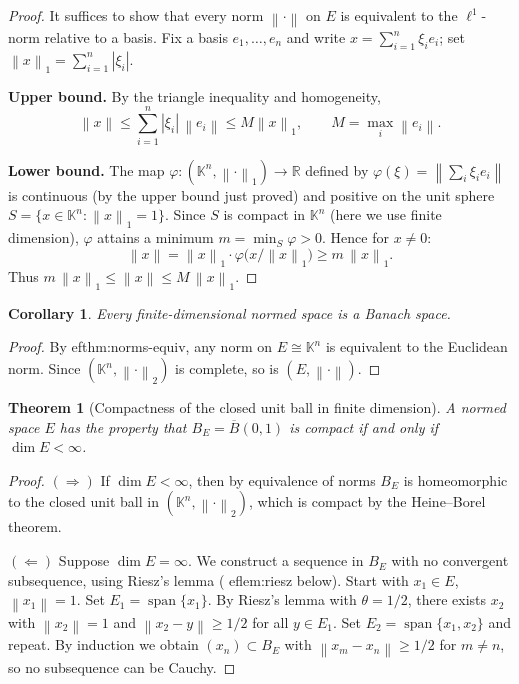 \documentclass[a4paper,12pt]{book}
\DeclareMathOperator{\spn}{span}
\newcommand{\R}{\mathbb{R}}
\newcommand{\K}{\mathbb{K}}
\newcommand{\norm}[1]{\left\| #1 \right\|}
\newcommand{\abs}[1]{\left| #1 \right|}
\theoremstyle{definition}
\theoremstyle{plain}
\newtheorem{theorem}[definition]{Theorem}
\newtheorem{corollary}[definition]{Corollary}
\theoremstyle{remark}
\begin{document}
\begin{proof}
It suffices to show that every norm $\norm{\cdot}$ on $E$ is equivalent
to the $\ell^1$-norm relative to a basis.  Fix a basis $e_1,\dots,e_n$
and write $x=\sum_{i=1}^n \xi_i e_i$; set
$\norm{x}_1=\sum_{i=1}^n\abs{\xi_i}$.

\textbf{Upper bound.}  By the triangle inequality and homogeneity,
\[
  \norm{x} \le \sum_{i=1}^n\abs{\xi_i}\,\norm{e_i}
  \le M\norm{x}_1,
  \qquad M = \max_i \norm{e_i}.
\]

\textbf{Lower bound.}  The map $\varphi:(\K^n,\norm{\cdot}_1)\to\R$
defined by $\varphi(\xi)=\norm{\sum_i\xi_i e_i}$ is continuous (by the
upper bound just proved) and positive on the unit sphere
$S=\{x\in\K^n:\norm{x}_1=1\}$.  Since $S$ is compact in $\K^n$
(here we use finite dimension), $\varphi$ attains a minimum
$m=\min_{S}\varphi > 0$.  Hence for $x\ne 0$:
\[
  \norm{x}
  = \norm{x}_1\cdot\varphi\!\bigl(x/\norm{x}_1\bigr)
  \ge m\,\norm{x}_1.
\]
Thus $m\,\norm{x}_1\le\norm{x}\le M\,\norm{x}_1$.
\end{proof}

\begin{corollary}
\label{cor:finite-dim-banach}
Every finite-dimensional normed space is a Banach space.
\end{corollary}

\begin{proof}
By 
ef{thm:norms-equiv}, any norm on $E\cong\K^n$ is equivalent to the
Euclidean norm.  Since $(\K^n,\norm{\cdot}_2)$ is complete, so is
$(E,\norm{\cdot})$.
\end{proof}

\begin{theorem}[{Compactness of the closed unit ball in finite dimension}]
\label{thm:unit-ball-compact}
A normed space $E$ has the property that $B_E=\overline{B}(0,1)$ is
compact if and only if $\dim E<\infty$.
\end{theorem}

\begin{proof}
$(\Rightarrow)$  If $\dim E<\infty$, then by equivalence of norms $B_E$
is homeomorphic to the closed unit ball in $(\K^n,\norm{\cdot}_2)$, which
is compact by the Heine--Borel theorem.

$(\Leftarrow)$  Suppose $\dim E=\infty$.  We construct a sequence in $B_E$
with no convergent subsequence, using Riesz's lemma (
ef{lem:riesz}
below).  Start with $x_1\in E$, $\norm{x_1}=1$.  Set $E_1=\spn\{x_1\}$.
By Riesz's lemma with $\theta=1/2$, there exists $x_2$ with
$\norm{x_2}=1$ and $\norm{x_2-y}\ge 1/2$ for all $y\in E_1$.  Set
$E_2=\spn\{x_1,x_2\}$ and repeat.  By induction we obtain
$(x_n)\subset B_E$ with $\norm{x_m-x_n}\ge 1/2$ for $m\ne n$, so no
subsequence can be Cauchy.
\end{proof}
\end{document}
